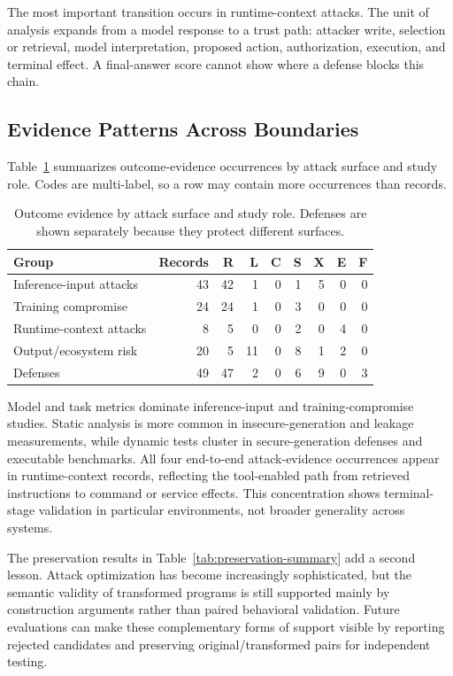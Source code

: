 \documentclass[acmsmall,screen,review]{acmart}
\begin{document}
The most important transition occurs in runtime-context attacks. The unit of analysis expands from a model response to a trust path: attacker write, selection or retrieval, model interpretation, proposed action, authorization, execution, and terminal effect. A final-answer score cannot show where a defense blocks this chain.

\subsection{Evidence Patterns Across Boundaries}
Table~\ref{tab:surface-evidence} summarizes outcome-evidence occurrences by attack surface and study role. Codes are multi-label, so a row may contain more occurrences than records.

{\scriptsize
\begin{table}[t]
\centering
\caption{Outcome evidence by attack surface and study role. Defenses are shown separately because they protect different surfaces.}
\label{tab:surface-evidence}
\begin{tabular}{@{}lrrrrrrrr@{}}
\toprule
\textbf{Group} & \textbf{Records} & \textbf{R} & \textbf{L} & \textbf{C} & \textbf{S} & \textbf{X} & \textbf{E} & \textbf{F} \\
\midrule
Inference-input attacks & 43 & 42 & 1 & 0 & 1 & 5 & 0 & 0 \\
Training compromise & 24 & 24 & 1 & 0 & 3 & 0 & 0 & 0 \\
Runtime-context attacks & 8 & 5 & 0 & 0 & 2 & 0 & 4 & 0 \\
Output/ecosystem risk & 20 & 5 & 11 & 0 & 8 & 1 & 2 & 0 \\
Defenses & 49 & 47 & 2 & 0 & 6 & 9 & 0 & 3 \\
\bottomrule
\end{tabular}
\end{table}
}

Model and task metrics dominate inference-input and training-compromise studies. Static analysis is more common in insecure-generation and leakage measurements, while dynamic tests cluster in secure-generation defenses and executable benchmarks. All four end-to-end attack-evidence occurrences appear in runtime-context records, reflecting the tool-enabled path from retrieved instructions to command or service effects. This concentration shows terminal-stage validation in particular environments, not broader generality across systems.

The preservation results in Table~\ref{tab:preservation-summary} add a second lesson. Attack optimization has become increasingly sophisticated, but the semantic validity of transformed programs is still supported mainly by construction arguments rather than paired behavioral validation. Future evaluations can make these complementary forms of support visible by reporting rejected candidates and preserving original/transformed pairs for independent testing.
\end{document}
